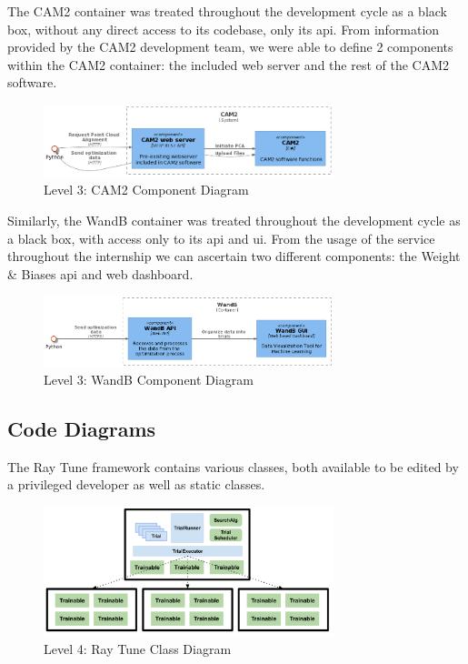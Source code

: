 The CAM2 container was treated throughout the development cycle as a black box, without any direct access to its codebase, only its \acrfull{api}. From information provided by the CAM2 development team, we were able to define 2 components within the CAM2 container: the included web server and the rest of the CAM2 software.

\begin{figure}[H]
\centering
\includegraphics[width=0.75\textwidth]{images/c3_cam2.png}
\caption{Level 3: CAM2 Component Diagram}
\label{fig:l3_cam2}
\end{figure}

Similarly, the WandB container was treated throughout the development cycle as a black box, with access only to its \acrfull{api} and \acrshort{ui}. From the usage of the service throughout the internship we can ascertain two different components: the Weight \& Biases \acrshort{api} and web dashboard.

\begin{figure}[H]
\centering
\includegraphics[width=0.75\textwidth]{images/c3_wandb.png}
\caption{Level 3: WandB Component Diagram}
\label{fig:l3_wandb}
\end{figure}

\subsection{Code Diagrams}

The Ray Tune framework contains various classes, both available to be edited by a privileged developer as well as static classes.

\begin{figure}[H]
\centering
\includegraphics[width=0.75\textwidth, keepaspectratio]{images/tune_component.png}
\caption{Level 4: Ray Tune Class Diagram \parencite{ray}}
\label{fig:l3_ray}
\end{figure}


